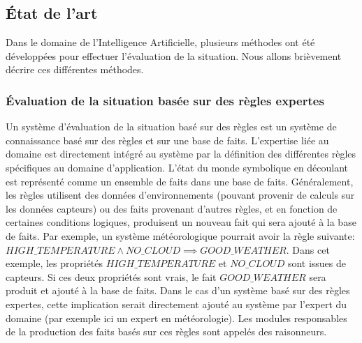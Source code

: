 \documentclass[a4paper,11pt,twoside]{StyleThese}
\begin{document}


\subsection{État de l'art}

Dans le domaine de l'Intelligence Artificielle, plusieurs méthodes ont été développées pour effectuer l'évaluation de la situation. Nous allons brièvement décrire ces différentes méthodes.

\subsubsection{Évaluation de la situation basée sur des règles expertes}
Un système d'évaluation de la situation basé sur des règles est un système de connaissance basé sur des règles et sur une base de faits. L'expertise liée au domaine est directement intégré au système par la définition des différentes règles spécifiques au domaine d'application. L'état du monde symbolique en découlant est représenté comme un ensemble de faits dans une base de faits.
Généralement, les règles utilisent des données d'environnements (pouvant provenir de calculs sur les données capteurs) ou des faits provenant d'autres règles, et en fonction de certaines conditions logiques, produisent un nouveau fait qui sera ajouté à la base de faits. 
Par exemple, un système météorologique pourrait avoir la règle suivante: \newline
$HIGH\_TEMPERATURE \land NO\_CLOUD \implies GOOD\_WEATHER$. \newline
Dans cet exemple, les propriétés $HIGH\_TEMPERATURE$ et $NO\_CLOUD$ sont issues de capteurs. Si ces deux propriétés sont vrais, le fait $GOOD\_WEATHER$ sera produit et ajouté à la base de faits. Dans le cas d'un système basé sur des règles expertes, cette implication serait directement ajouté au système par l'expert du domaine (par exemple ici un expert en météorologie). 
Les modules responsables de la production des faits basés sur ces règles sont appelés des raisonneurs.
\end{document}
